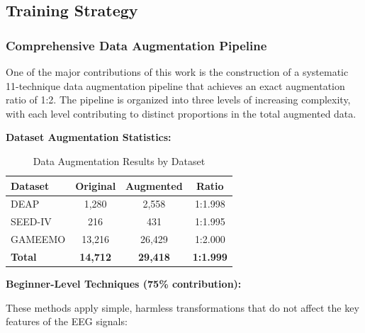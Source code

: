 \documentclass[conference]{IEEEtran}
\begin{document}
\subsection{Training Strategy}

\subsubsection{Comprehensive Data Augmentation Pipeline}

One of the major contributions of this work is the construction of a systematic 11-technique data augmentation pipeline that achieves an exact augmentation ratio of 1:2. The pipeline is organized into three levels of increasing complexity, with each level contributing to distinct proportions in the total augmented data.

\textbf{Dataset Augmentation Statistics:}

\begin{table}[!htbp]
\centering
\caption{Data Augmentation Results by Dataset}
\label{tab:augmentation_stats}
\begin{tabular}{lccc}
\toprule
\textbf{Dataset} & \textbf{Original} & \textbf{Augmented} & \textbf{Ratio} \\
\midrule
DEAP & 1,280 & 2,558 & 1:1.998 \\
SEED-IV & 216 & 431 & 1:1.995 \\
GAMEEMO & 13,216 & 26,429 & 1:2.000 \\
\midrule
\textbf{Total} & \textbf{14,712} & \textbf{29,418} & \textbf{1:1.999} \\
\bottomrule
\end{tabular}
\end{table}

\textbf{Beginner-Level Techniques (75\% contribution):}

These methods apply simple, harmless transformations that do not affect the key features of the EEG signals:
\end{document}
